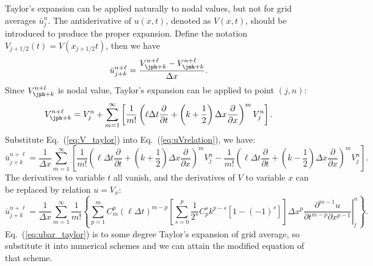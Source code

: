 \documentclass[]{article}
\begin{document}
Taylor's expansion can be applied naturally to nodal values, but not for
grid averages $\bar u_j^n$. The antiderivative of $u(x,t)$, 
denoted as $V(x,t)$,
should be introduced to produce the proper expansion. Define the notation
$V_{j+1/2}(t)=V(x_{j+1/2}t)$, then we have
\begin{equation}
  \bar u_{j+k}^{n+\ell}=
  \frac{V_{\jph+k}^{n+\ell}-V_{\jmh+k}^{n+\ell}}{\Delta x}.
  \label{eq:uVrelation}
\end{equation}
Since $V_{\jph+k}^{n+l}$ is nodal value, Taylor's expansion can be
applied to point $(j,n)$:
\begin{equation}
  V_{\jph+k}^{n+\ell} = V_{j}^n + \sum_{m=1}^{\infty}
  \left[ 
    \frac{1}{m!} 
    \left(
    \ell\Delta t \frac{\partial}{\partial t} + 
    \left(k+\frac{1}{2}\right) \Delta x\frac{\partial}{\partial x}
    \right)^m V_j^n
    \right].
  \label{eq:V_taylor}
\end{equation}
Substitute Eq.~(\ref{eq:V_taylor}) into Eq.~(\ref{eq:uVrelation}), we
have:
\begin{equation}
  \bar u_{j+k}^{n+\ell} = \frac{1}{\Delta x} \sum_{m=1}^{\infty} 
  \left[
    \frac{1}{m!}\left( \ell\Delta t\frac{\partial}{\partial t} +
    \left(k+\frac{1}{2}\right)\Delta x\frac{\partial}{\partial x}\right)^m 
    V_j^n -
    \frac{1}{m!}\left(\ell\Delta t\frac{\partial}{\partial t} +
    \left(k-\frac{1}{2}\right)\Delta x\frac{\partial}{\partial x}\right)^m 
    V_j^n
    \right].
  \label{eq:uVrelation2}
\end{equation}
The derivatives to variable $t$ all vanish, and the derivatives of $V$ to
variable $x$ can be replaced by relation $u=V_x$:
\begin{equation}
  \bar u_{j+k}^{n+\ell} = \frac{1}{\Delta x} \sum_{m=1}^{\infty}\frac{1}{m!}
  \left\{
  \sum_{p=1}^m C_m^p(\ell\Delta t)^{m-p} 
  \left[
    \sum_{s=0}^p \frac{1}{2^s}C_p^s k^{p-s}\left[1-(-1)^s\right]
    \right]
  \Delta x^p 
  \left. 
  \frac{\partial ^{m-1}u}{\partial t^{m-p}\partial x^{p-1}}
  \right|_j^n
  \right\}.
  \label{eq:ubar_taylor}
\end{equation}
Eq.~(\ref{eq:ubar_taylor}) is to some degree Taylor's expansion of
grid average, so substitute it into numerical schemes and we can
attain the modified equation of that scheme.
\end{document}
